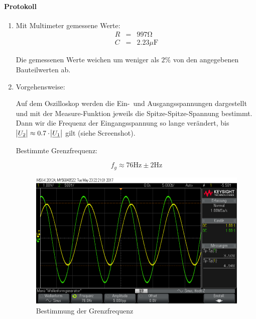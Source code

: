 \documentclass[10pt]{scrreprt}
\begin{document}
    \paragraph{Protokoll}
    \begin{enumerate}
        \item Mit Multimeter gemessene Werte:
            \begin{eqnarray*}
                R &=& 997\si{\ohm}\\
                C &=& 2.23\si{\mu\farad}
            \end{eqnarray*}

            Die gemessenen Werte weichen um weniger als $2\%$ von den angegebenen
            Bauteilwerten ab.
        \item
        Vorgehensweise:

        Auf dem Oszilloskop werden die Ein-~und Ausgangsspannungen dargestellt und
        mit der Measure-Funktion jeweils die Spitze-Spitze-Spannung bestimmt.
        Dann wir die Frequenz der Eingangsspannung so lange verändert, bis
        $\abs{\underline{U_2}} \approx 0.7 \cdot \abs{\underline{U_1}}$ gilt (siehe
        Screenshot).

        Bestimmte Grenzfrequenz:

        \begin{equation*}
            f_g \approx 76\si{\hertz} \pm 2\si{\hertz}
        \end{equation*}

        \begin{center}
            \begin{figure}[H]
                \includegraphics[width=\textwidth]{scope_4.png}
                \caption{Bestimmung der Grenzfrequenz}
            \end{figure}
        \end{center}


\end{enumerate}
\end{document}
